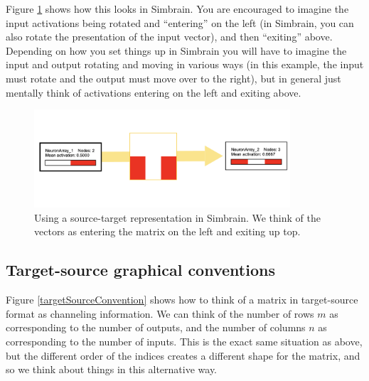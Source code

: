 Figure \ref{sourceTargetSimbrain} shows how this looks in Simbrain. You are encouraged to imagine  the input activations being rotated and ``entering'' on the left (in Simbrain, you can also rotate the presentation of the input vector), and then ``exiting'' above. Depending on how you set things up in Simbrain you will have to imagine the input and output rotating and moving in various ways (in this example, the input must rotate and the output must move over to the right), but in general just mentally think of activations entering on the left and exiting above.

\begin{figure}[h]
\centering
\includegraphics[width=0.85\textwidth]{images/sourceTargetSimbrain.png}
\caption[Jeff Yoshimi.]{Using a source-target representation in Simbrain. We think of the vectors as entering the matrix on the left and exiting up top.}
\label{sourceTargetSimbrain}
\end{figure}

\subsection{Target-source graphical conventions}

Figure \ref{targetSourceConvention} shows how to think of a matrix in target-source format as channeling information. We can think of the number of rows $m$ as corresponding to the number of outputs, and the number of columns $n$ as corresponding to the number of inputs. This is the exact same situation as above, but the different order of the indices creates a different shape for the matrix, and so we  think about things in this alternative way. 



